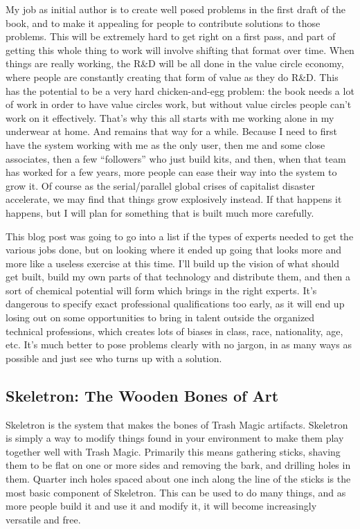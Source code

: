 My job as initial author is to create well posed problems in the first
draft of the book, and to make it appealing for people to contribute
solutions to those problems. This will be extremely hard to get right on
a first pass, and part of getting this whole thing to work will involve
shifting that format over time. When things are really working, the R\&D
will be all done in the value circle economy, where people are
constantly creating that form of value as they do R\&D. This has the
potential to be a very hard chicken-and-egg problem: the book needs a
lot of work in order to have value circles work, but without value
circles people can't work on it effectively. That's why this all starts
with me working alone in my underwear at home. And remains that way for
a while. Because I need to first have the system working with me as the
only user, then me and some close associates, then a few ``followers''
who just build kits, and then, when that team has worked for a few
years, more people can ease their way into the system to grow it. Of
course as the serial/parallel global crises of capitalist disaster
accelerate, we may find that things grow explosively instead. If that
happens it happens, but I will plan for something that is built much
more carefully.

This blog post was going to go into a list if the types of experts
needed to get the various jobs done, but on looking where it ended up
going that looks more and more like a useless exercise at this time.
I'll build up the vision of what should get built, build my own parts of
that technology and distribute them, and then a sort of chemical
potential will form which brings in the right experts. It's dangerous to
specify exact professional qualifications too early, as it will end up
losing out on some opportunities to bring in talent outside the
organized technical professions, which creates lots of biases in class,
race, nationality, age, etc. It's much better to pose problems clearly
with no jargon, in as many ways as possible and just see who turns up
with a solution.

\subsection{Skeletron: The Wooden Bones of
Art}\label{skeletron-the-wooden-bones-of-art}

Skeletron is the system that makes the bones of Trash Magic artifacts.
Skeletron is simply a way to modify things found in your environment to
make them play together well with Trash Magic. Primarily this means
gathering sticks, shaving them to be flat on one or more sides and
removing the bark, and drilling holes in them. Quarter inch holes spaced
about one inch along the line of the sticks is the most basic component
of Skeletron. This can be used to do many things, and as more people
build it and use it and modify it, it will become increasingly versatile
and free.

